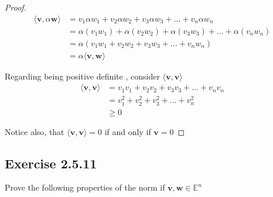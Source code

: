 \documentclass{tufte-book}
\theoremstyle{mytheoremstyle}
\theoremstyle{mylemstyle}
\theoremstyle{mydefstyle}
\begin{document}
\begin{proof}
\begin{align*}
\langle \mathbf{v}, \alpha \mathbf{w} \rangle &= v_1 \alpha w_1 + v_2 \alpha w_2 + v_3 \alpha w_3 +...+ v_n \alpha w_n \\
&= \alpha(v_1w_1) + \alpha(v_2w_2) + \alpha(v_3w_3) +...+\alpha(v_nw_n) \\
&=\alpha (v_1w_1 + v_2w_2 + v_3w_3 +...+v_nw_n) \\
&= \alpha \langle \mathbf{v}, \mathbf{w} \rangle 
\end{align*}

Regarding being positive definite , consider $\langle\mathbf{v}, \mathbf{v}\rangle$
\begin{align*}
\langle\mathbf{v}, \mathbf{v}\rangle &= v_1v_1 + v_2v_2 + v_3v_3 +...+v_nv_n \\
&= v_1^2 + v_2^2 + v_3^2 +...+v_n^2\\
&\geq 0
\end{align*}

Notice also, that $\langle\mathbf{v}, \mathbf{v}\rangle = 0$ if and only if $\mathbf{v} = 0$

\end{proof}

\subsection{Exercise 2.5.11}
Prove the following properties of the norm if $\mathbf{v},\mathbf{w} \in \mathbb{E}^n$
\end{document}
